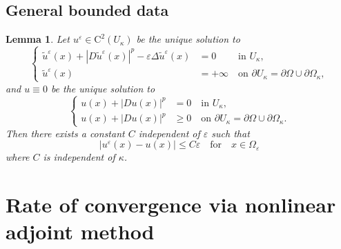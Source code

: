 \documentclass[11pt,reqno]{amsart}
\numberwithin{figure}{section}
\theoremstyle{plain}
\newtheorem{lem}[thm]{Lemma}
\theoremstyle{remark}
\numberwithin{equation}{section}
\begin{document}
\subsection{General bounded data}





\begin{lem} Let $u^\varepsilon\in \mathrm{C}^2(U_\kappa)$ be the unique solution to 
\begin{equation*}
    \left\{
        \begin{aligned}
            \tilde{u}^\varepsilon(x) + |D\tilde{u}^\varepsilon(x)|^p-\varepsilon \Delta \tilde{u}^\varepsilon(x) &=0 \;\qquad \text{in } U_\kappa ,\\
            \tilde{u}^\varepsilon(x) &= +\infty \quad \text{on } \partial U_\kappa = \partial \Omega\cup \partial \Omega_{\kappa},
        \end{aligned}
    \right.
\end{equation*}
and $u \equiv 0 $ be the unique solution to 
\begin{equation*}
    \left\{
        \begin{aligned}
            u(x)+ |Du(x)|^p &=0 \quad \text{in } U_\kappa ,\\
            u(x)+ |Du(x)|^p &\geq 0 \quad \text{on } \partial U_\kappa = \partial \Omega \cup\partial \Omega_{\kappa}.
        \end{aligned}
    \right.
\end{equation*}
Then there exists a constant $C$ independent of $\varepsilon$ such that
\begin{equation*}
  |u^\varepsilon(x) - u(x)| \leq C\varepsilon \quad  \text{for} \quad x\in \Omega_{\varepsilon}
\end{equation*}
where $C$ is independent of $\kappa$.
\end{lem}



\clearpage


\section{Rate of convergence via nonlinear adjoint method}
\end{document}
